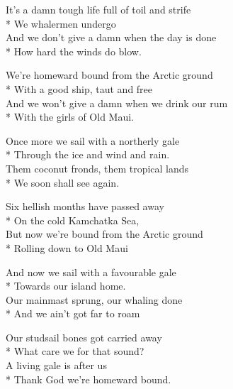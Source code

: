 
\contd
{}

\versemark
It’s a damn tough life full of toil and strife\\*
We whalermen undergo\\
And we don’t give a damn when the day is done\\*
How hard the winds do blow.

\contd
{}

We’re homeward bound from the Arctic ground\\*
With a good ship, taut and free\\
And we won’t give a damn when we drink our rum\\*
With the girls of Old Maui.

\contd
{}


\versemark
Once more we sail with a northerly gale\\*
Through the ice and wind and rain.\\
Them coconut fronds, them tropical lands\\*
We soon shall see again.

Six hellish months have passed away\\*
On the cold Kamchatka Sea,\\
But now we’re bound from the Arctic ground\\*
Rolling down to Old Maui

\versemark
And now we sail with a favourable gale\\*
Towards our island home.\\
Our mainmast sprung, our whaling done\\*
And we ain’t got far to roam

Our studsail bones got carried away\\*
What care we for that sound?\\
A living gale is after us\\*
Thank God we’re homeward bound.


